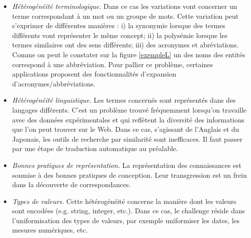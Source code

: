\begin{itemize}
\item \textit{Hétérogénéité terminologique.} Dans ce cas les variations vont concerner un terme correspondant à un mot ou un groupe de mots. Cette variation peut s'exprimer de différentes manières : i) la synonymie lorsque des termes différents vont représenter le même concept; ii) la polysémie lorsque les termes similaires ont des sens différents; iii) des acronymes et abréviations. 
Comme on peut le constater sur la figure \ref{exempleL} un des noms des entités correspond à une abbréviation. Pour pallier ce problème, certaines applications proposent des fonctionnalités d'expansion d'acronymes/abbréviations.\\
\item \textit{Hétérogénéité linguistique.}  Les termes concernés sont représentés dans des langages différents. C'est un problème trouvé fréquemment lorsqu'on travaille avec des données expérimentales et qui reflètent la diversité des informations que l'on peut trouver sur le Web. Dans ce cas, s'agissant de l'Anglais et du Japonais, les outils de recherche par similarité sont inefficaces. Il faut passer par une étape de traduction automatique au préalable. \\
\item \textit{Bonnes pratiques de représentation.} La représentation des connaissances est soumise à des bonnes pratiques de conception. Leur transgression est un frein dans la découverte de correspondances.\\
\item \textit{Types de valeurs.} Cette hétérogénéité concerne la manière dont les valeurs sont encodées (e.g. string, integer, etc.). Dans ce cas, le challenge réside dans l'uniformisation des types de valeurs, par exemple uniformiser les dates, les mesures numériques, etc.\\
\end{itemize}

